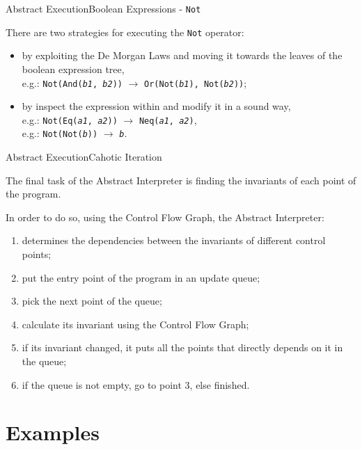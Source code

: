 \documentclass{beamer}
\begin{document}
\begin{frame}{Abstract Execution}{Boolean Expressions - \texttt{Not}}

    There are two strategies for executing the \texttt{Not} operator:
    \begin{itemize}
        \item by exploiting the De Morgan Laws and moving it towards the leaves of the boolean expression tree,\\
              e.g.: \texttt{Not(And(\textit{b1}, \textit{b2}))} $\rightarrow$ \texttt{Or(Not(\textit{b1}), Not(\textit{b2}))};
        \item by inspect the expression within and modify it in a sound way,\\
              e.g.: \texttt{Not(Eq(\textit{a1}, \textit{a2}))} $\rightarrow$ \texttt{Neq(\textit{a1}, \textit{a2})},\\
              e.g.: \texttt{Not(Not(\textit{b}))} $\rightarrow$ \texttt{\textit{b}}.
    \end{itemize}

\end{frame}

\begin{frame}{Abstract Execution}{Cahotic Iteration}

    The final task of the Abstract Interpreter is finding the invariants of each point of the program.

    In order to do so, using the Control Flow Graph, the Abstract Interpreter:
    \begin{enumerate}
        \item determines the dependencies between the invariants of different control points;
        \item put the entry point of the program in an update queue;
        \item pick the next point of the queue;
        \item calculate its invariant using the Control Flow Graph;
        \item if its invariant changed, it puts all the points that directly depends on it in the queue;
        \item if the queue is not empty, go to point 3, else finished.
    \end{enumerate}

\end{frame}

\section*{Examples}
\end{document}
